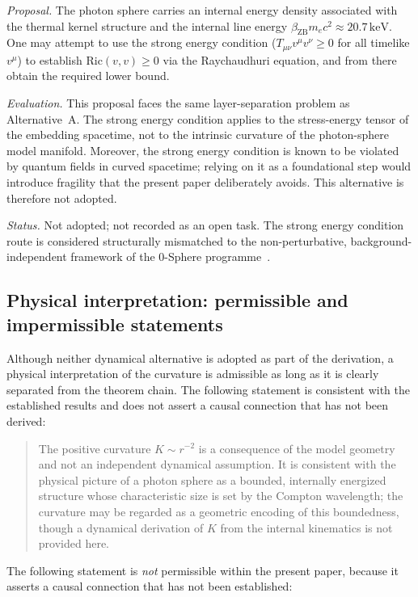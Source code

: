 \documentclass[%
 reprint, amsmath,amssymb, aps, prb, ]{revtex4-2}
\numberwithin{equation}{section}
\begin{document}
\textit{Proposal.} The photon sphere carries an internal energy density associated with the thermal kernel structure and the internal line energy $\beta_{\mathrm{ZB}}m_ec^2 \approx 20.7\,\mathrm{keV}$. One may attempt to use the strong energy condition ($T_{\mu\nu}v^\mu v^\nu \geq 0$ for all timelike $v^\mu$) to establish $\mathrm{Ric}(v,v) \geq 0$ via the Raychaudhuri equation, and from there obtain the required lower bound.

\textit{Evaluation.} This proposal faces the same layer-separation problem as Alternative~A. The strong energy condition applies to the stress-energy tensor of the embedding spacetime, not to the intrinsic curvature of the photon-sphere model manifold. Moreover, the strong energy condition is known to be violated by quantum fields in curved spacetime; relying on it as a foundational step would introduce fragility that the present paper deliberately avoids. This alternative is therefore not adopted.

\textit{Status.} Not adopted; not recorded as an open task. The strong energy condition route is considered structurally mismatched to the non-perturbative, background-independent framework of the 0-Sphere programme~\cite{hanamura36}.

\subsection{Physical interpretation: permissible and impermissible statements}

Although neither dynamical alternative is adopted as part of the derivation, a physical interpretation of the curvature is admissible as long as it is clearly separated from the theorem chain. The following statement is consistent with the established results and does not assert a causal connection that has not been derived:

\begin{quote}
The positive curvature $K \sim r^{-2}$ is a consequence of the model geometry and not an independent dynamical assumption. It is consistent with the physical picture of a photon sphere as a bounded, internally energized structure whose characteristic size is set by the Compton wavelength; the curvature may be regarded as a geometric encoding of this boundedness, though a dynamical derivation of $K$ from the internal kinematics is not provided here.
\end{quote}

The following statement is \emph{not} permissible within the present paper, because it asserts a causal connection that has not been established:
\end{document}
